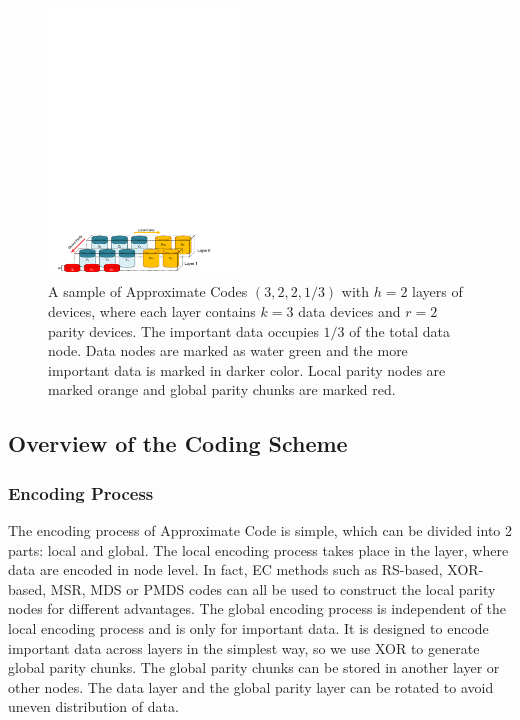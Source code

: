 \documentclass[sigconf]{acmart}
\begin{document}
\begin{figure}[h]
\centering
\includegraphics[width=0.45\textwidth]{photo/AP-kmha-v4.pdf}
\caption{A sample of Approximate Codes $(3,2,2,1/3)$ with $h=2$ layers of devices, where each layer contains $k=3$ data devices and $r=2$ parity devices.
The important data occupies $1/3$ of the total data node.
Data nodes are marked as water green and the more important data is marked in darker color. Local parity nodes are marked orange and global parity chunks are marked red.}
\label{fig-Ap-322}
\end{figure}

\subsection{Overview of the Coding Scheme}
\subsubsection{Encoding Process}

The encoding process of Approximate Code is simple, which can be divided into 2 parts: local and global.
The local encoding process takes place in the layer, where data are encoded in node level. In fact, EC methods such as RS-based, XOR-based, MSR, MDS or PMDS codes can all be used to construct the local parity nodes for different advantages.
The global encoding process is independent of the local encoding process and is only for important data. It is designed to encode important data across layers in the simplest way, so we use XOR to generate global parity chunks.
The global parity chunks can be stored in another layer or other nodes. The data layer and the global parity layer can be rotated to avoid uneven distribution of data.
\end{document}
